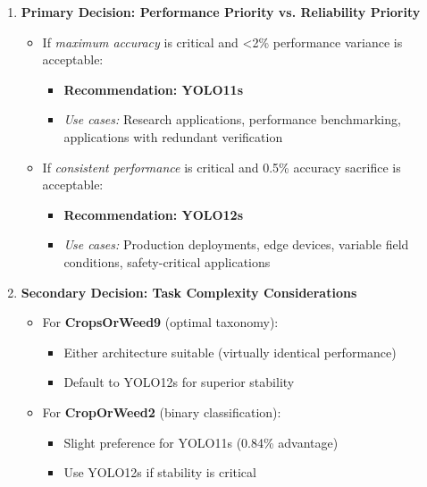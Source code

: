 \begin{enumerate}
    \item \textbf{Primary Decision: Performance Priority vs. Reliability Priority}
    
    \begin{itemize}
        \item If \textit{maximum accuracy} is critical and <2\% performance variance is acceptable:
        \begin{itemize}
            \item \textbf{Recommendation: YOLO11s}
            \item \textit{Use cases:} Research applications, performance benchmarking, applications with redundant verification
        \end{itemize}
        
        \item If \textit{consistent performance} is critical and 0.5\% accuracy sacrifice is acceptable:
        \begin{itemize}
            \item \textbf{Recommendation: YOLO12s}
            \item \textit{Use cases:} Production deployments, edge devices, variable field conditions, safety-critical applications
        \end{itemize}
    \end{itemize}
    
    \item \textbf{Secondary Decision: Task Complexity Considerations}
    
    \begin{itemize}
        \item For \textbf{CropsOrWeed9} (optimal taxonomy):
        \begin{itemize}
            \item Either architecture suitable (virtually identical performance)
            \item Default to YOLO12s for superior stability
        \end{itemize}
        
        \item For \textbf{CropOrWeed2} (binary classification):
        \begin{itemize}
            \item Slight preference for YOLO11s (0.84\% advantage)
            \item Use YOLO12s if stability is critical
        \end{itemize}
        

\end{itemize}
\end{enumerate}
